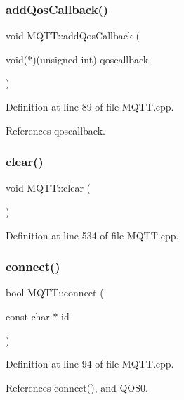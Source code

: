 \subsubsection{\texorpdfstring{add\+Qos\+Callback()}{addQosCallback()}}
{\footnotesize\ttfamily void M\+Q\+T\+T\+::add\+Qos\+Callback (\begin{DoxyParamCaption}\item[{void($\ast$)(unsigned int)}]{qoscallback }\end{DoxyParamCaption})}



Definition at line 89 of file M\+Q\+T\+T.\+cpp.



References qoscallback.

\mbox{\label{class_m_q_t_t_a510932d1c5fb0c918debcf60cfc267e1}} 
\subsubsection{\texorpdfstring{clear()}{clear()}}
{\footnotesize\ttfamily void M\+Q\+T\+T\+::clear (\begin{DoxyParamCaption}{ }\end{DoxyParamCaption})}



Definition at line 534 of file M\+Q\+T\+T.\+cpp.

\mbox{\label{class_m_q_t_t_ae76d538b01191df33610a950bf4e9717}} 
\subsubsection{\texorpdfstring{connect()}{connect()}\hspace{0.1cm}{\footnotesize\ttfamily [1/3]}}
{\footnotesize\ttfamily bool M\+Q\+T\+T\+::connect (\begin{DoxyParamCaption}\item[{const char $\ast$}]{id }\end{DoxyParamCaption})}



Definition at line 94 of file M\+Q\+T\+T.\+cpp.



References connect(), and Q\+O\+S0.



